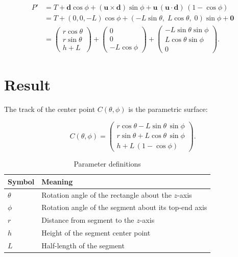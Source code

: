 \documentclass[12pt,a4paper]{article}
\begin{document}
\begin{align}
  P' &= T + \mathbf{d}\cos\phi + (\mathbf{u}\times\mathbf{d})\sin\phi
        + \mathbf{u}\,(\mathbf{u}\cdot\mathbf{d})\,(1-\cos\phi) \nonumber \\
     &= T + (0,0,-L)\cos\phi + (-L\sin\theta,\; L\cos\theta,\; 0)\sin\phi + \mathbf{0} \nonumber \\
     &= \begin{pmatrix}
          r\cos\theta \\
          r\sin\theta \\
          h+L
        \end{pmatrix}
        + \begin{pmatrix} 0 \\ 0 \\ -L\cos\phi \end{pmatrix}
        + \begin{pmatrix} -L\sin\theta\sin\phi \\ L\cos\theta\sin\phi \\ 0 \end{pmatrix}.
\end{align}

\section{Result}

The track of the center point $C(\theta,\phi)$ is the parametric surface:

\begin{equation}\label{eq:result}
\boxed{
C(\theta,\phi)
= \begin{pmatrix}
    r\cos\theta - L\sin\theta\,\sin\phi \\[6pt]
    r\sin\theta + L\cos\theta\,\sin\phi \\[6pt]
    h + L\,(1 - \cos\phi)
  \end{pmatrix}.
}
\end{equation}

\begin{table}[htbp]
  \centering
  \caption{Parameter definitions}
  \begin{tabular}{@{}ll@{}}
    \toprule
    Symbol & Meaning \\
    \midrule
    $\theta$ & Rotation angle of the rectangle about the $z$-axis \\
    $\phi$   & Rotation angle of the segment about its top-end axis \\
    $r$      & Distance from segment to the $z$-axis \\
    $h$      & Height of the segment center point \\
    $L$      & Half-length of the segment \\
    \bottomrule
  \end{tabular}
\end{table}
\end{document}

